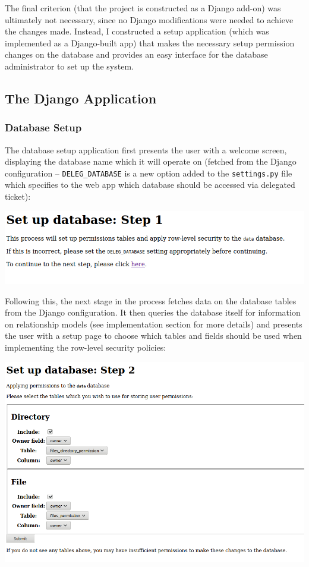 \documentclass{article}
\begin{document}
The final criterion (that the project is constructed as a Django add-on) was ultimately not necessary, since no Django modifications were needed to achieve the changes made. Instead, I constructed a setup application (which was implemented as a Django-built app) that makes the necessary setup permission changes on the database and provides an easy interface for the database administrator to set up the system.

\subsection{The Django Application}

\subsubsection{Database Setup}
The database setup application first presents the user with a welcome screen, displaying the database name which it will operate on (fetched from the Django configuration -- \verb+DELEG_DATABASE+ is a new option added to the \verb+settings.py+ file which specifies to the web app which database should be accessed via delegated ticket):

\begin{center}
  \includegraphics[scale=0.5]{02-setup1.png}
\end{center}

Following this, the next stage in the process fetches data on the database tables from the Django configuration. It then queries the database itself for information on relationship models (see implementation section for more details) and presents the user with a setup page to choose which tables and fields should be used when implementing the row-level security policies:

\begin{center}
  \includegraphics[width=\textwidth]{03-setup2.png}
\end{center}
\end{document}
